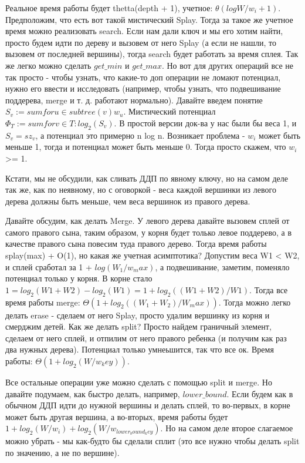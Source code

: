 Реальное время работы будет thetta(depth + 1), учетное: $\theta(log W/w_i + 1)$. Предположим, что есть вот такой мистический Splay. Тогда за такое же учетное время можно реализовать search. Если нам дали ключ и мы его хотим найти, просто будем идти по дереву и вызовем от него Splay (а если не нашли, то вызовем от последней вершины), тогда search будет работать за время сплея. Так же легко можно сделать $get\_min$ и $get\_max$. Но вот для других операций все не так просто - чтобы узнать, что какие-то доп операции не ломают потенциал, нужно его ввести и исследовать (например, чтобы узнать, что подвешивание поддерева, merge и т. д. работают нормально). Давайте введем понятие $S_v := sum for u \in subtree(v) w_u$. Мистический потенциал $\Phi_T := sum for v \in T: log_2(S_v)$. В простой версии док-ва у нас были бы веса 1, и $S_v = sz_v$, а потенциал это примерно n log n. Возникает проблема - $w_i$ может быть меньше 1, тогда и потенциал может быть меньше 0. Тогда просто скажем, что $w_i$ >= 1. 

Кстати, мы не обсудили, как сливать ДДП по явному ключу, но на самом деле так же, как по неявному, но с оговоркой - веса каждой вершинки из левого дерева должны быть меньше, чем веса вершинок из правого дерева.

Давайте обсудим, как делать Merge. У левого дерева давайте вызовем сплей от самого правого сына, таким образом, у корня будет только левое поддерево, а в качестве правого сына повесим туда правого дерево. Тогда время работы splay(max) + O(1), но какая же учетная асимптотика? Допустим веса W1 < W2, и сплей сработал за 1 + $log(W_1/w_max)$, а подвешивание, заметим, поменяло потенциал только у корня. В корне стало $1 = log_2(W1 + W2) - log_2(W1) = 1 + log_2((W1 + W2)/W1)$. Тогда все время работы merge: $\Theta(1 + log_2((W_1 + W_2)/W_max))$. Тогда можно легко делать erase - сделаем от него Splay, просто удалим вершинку из корня и смерджим детей. Как же делать split? Просто найдем граничный элемент, сделаем от него сплей, и отпилим от него правого ребенка (и получим как раз два нужных дерева). Потенциал только умнеьшится, так что все ок. Время работы: $\Theta(1 + log_2(W/w_key))$. 
 
Все остальные операции уже можно сделать с помощью split и merge. Но давайте подумаем, как быстро делать, например, $lower\_bound$. Если будем как в обычном ДДП идти до нужной вершины и делать сплей, то во-первых, в корне может быть другая вершина, а во-вторых, время работы будет $1 + log_2(W/w_i) + log_2(W/w_{lower_bound_key})$. Но на самом деле второе слагаемое можно убрать - мы как-будто бы сделали сплит (это все нужно чтобы делать split по значению, а не по вершине).

